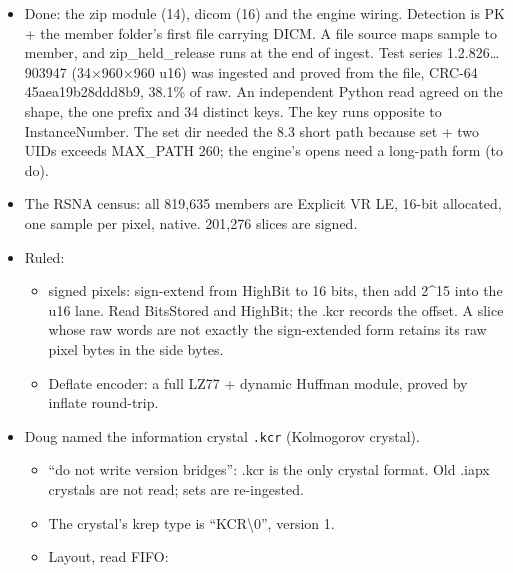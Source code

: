 \begin{itemize}
\begin{enumerate}
\item the zip module (ZIP64 walk moves out of npy.c; module 14);
\item dicom;
\item EngineSideBytes on EngineArrayRead;
\item .kcr v2;
\item one series end to end, then ping RSNA (rsna-knee-abnormality-7d).
\end{enumerate}
\item Done: the zip module (14), dicom (16) and the engine wiring. Detection is PK + the member folder's first file carrying DICM. A file source maps sample to member, and zip\_\allowbreak{}held\_\allowbreak{}release runs at the end of ingest. Test series 1.2.826…903947 (34×960×960 u16) was ingested and proved from the file, CRC-64 45aea19b28ddd8b9, 38.1\% of raw. An independent Python read agreed on the shape, the one prefix and 34 distinct keys. The key runs opposite to InstanceNumber. The set dir needed the 8.3 short path because set + two UIDs exceeds MAX\_\allowbreak{}PATH 260; the engine's opens need a long-path form (to do).
\item The RSNA census: all 819,635 members are Explicit VR LE, 16-bit allocated, one sample per pixel, native. 201,276 slices are signed.
\item Ruled:

\begin{itemize}
\item signed pixels: sign-extend from HighBit to 16 bits, then add 2\textasciicircum{}15 into the u16 lane. Read BitsStored and HighBit; the .kcr records the offset. A slice whose raw words are not exactly the sign-extended form retains its raw pixel bytes in the side bytes.
\item Deflate encoder: a full LZ77 + dynamic Huffman module, proved by inflate round-trip.
\end{itemize}
\item Doug named the information crystal \texttt{.\allowbreak{}kcr} (Kolmogorov crystal).

\begin{itemize}
\item “do not write version bridges”: .kcr is the only crystal format. Old .iapx crystals are not read; sets are re-ingested.
\item The crystal's krep type is “KCR\textbackslash{}0”, version 1.
\item Layout, read FIFO:


\end{itemize}
\end{itemize}

